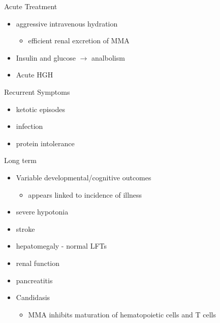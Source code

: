 \documentclass[presentation, smaller]{beamer}
\begin{document}
\begin{frame}[label={sec:orgheadline19}]{Acute Treatment}
\begin{itemize}
\item aggressive intravenous hydration
\begin{itemize}
\item efficient renal excretion of MMA
\end{itemize}
\item Insulin and glucose \(\to\) analbolism
\item Acute HGH
\end{itemize}
\end{frame}

\begin{frame}[label={sec:orgheadline20}]{Recurrent Symptoms}
\begin{itemize}
\item ketotic episodes
\item infection
\item protein intolerance
\end{itemize}
\end{frame}

\begin{frame}[label={sec:orgheadline21}]{Long term}
\begin{itemize}
\item Variable developmental/cognitive outcomes
\begin{itemize}
\item appears linked to incidence of illness
\end{itemize}
\item severe hypotonia
\item stroke
\item hepatomegaly - normal LFTs
\item \downarrown renal function
\item pancreatitis
\item Candidasis
\begin{itemize}
\item MMA inhibits maturation of hematopoietic cells and T cells
\end{itemize}
\end{itemize}
\end{frame}
\end{document}
